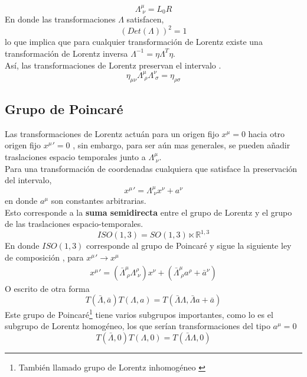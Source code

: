 \documentclass[12pt,letterpaper]{article}
\begin{document}
\begin{equation}
  \Lambda^\mu_{\;\nu} = L_0R
\end{equation}
En donde las transformaciones $\Lambda$ satisfacen,
\begin{equation}
  \left( Det(\Lambda) \right)^2 = 1
\end{equation}
lo que implica que para cualquier transformación de Lorentz existe una transformación de Lorentz inversa $\Lambda^{-1}=\eta \Lambda^T\eta$. \\
Así, las transformaciones de Lorentz preservan el intervalo \cite{weinberg-v1}.
\begin{equation}
  \eta_{\mu \nu} \Lambda^\mu_{\; \rho} \Lambda^\nu_{\; \sigma} = \eta_{\rho\sigma}
  \label{eq:intervalo}
\end{equation}
\subsection{Grupo de Poincaré}
Las transformaciones de Lorentz actuán para un origen fijo $x^\mu=0$ hacia otro origen fijo $x^\mu'=0$ , sin embargo, para ser aún mas generales, se pueden añadir traslaciones espacio temporales junto a $\Lambda^\mu_{\;\nu}$. \\
Para una transformación de coordenadas cualquiera que satisface la preservación del intervalo,
\begin{equation}
  x^\mu' = \Lambda^\mu_{\;\nu}x^\nu + a^\nu
\end{equation}
en donde $a^\mu$ son constantes arbitrarias. \\
Esto corresponde a la \textbf{suma semidirecta} entre el grupo de Lorentz y el grupo de las traslaciones espacio-temporales.
\begin{equation}
  ISO(1,3) = SO(1,3)\ltimes \mathbb{R}^{1,3}
\end{equation}
En donde $ISO(1,3)$ corresponde al grupo de Poincaré y sigue la siguiente ley de composición \cite{weinberg-v1}, para $x^\mu'\rightarrow x^\mu$
\begin{align}
  x^\mu' = \left(\bar{\Lambda}^\mu_{\; \rho} \Lambda^\rho_{\; \nu}\right)x^\nu + \left( \bar{\Lambda}^\mu_{\;\rho}a^\rho + \bar{{a}}^\nu\right)
\end{align}
O escrito de otra forma \cite{weinberg-v1}
\begin{equation}
  T(\bar{\Lambda},\bar{{a}}) T(\Lambda,a) = T(\bar{\Lambda}\Lambda, \bar{\Lambda}a + \bar{{a}}) 
\end{equation}
Este grupo de Poincaré\footnote{También llamado grupo de Lorentz inhomogéneo \cite{apunte}} tiene varios subgrupos importantes, como lo es el subgrupo de Lorentz homogéneo, los que serían transformaciones del tipo $a^\mu=0$
\begin{equation}
  T(\bar{\Lambda},0) T(\Lambda,0) = T(\bar{\Lambda}\Lambda,0)
\end{equation}
\end{document}
